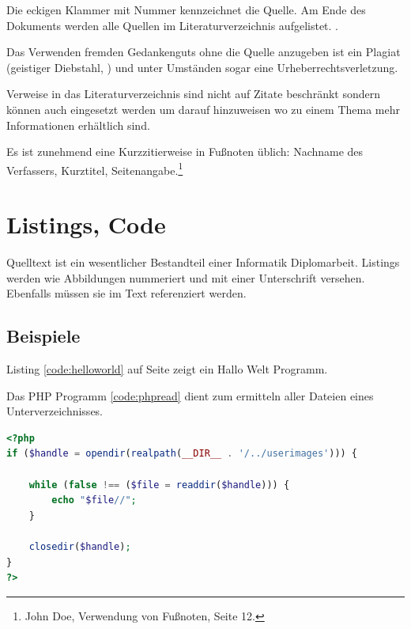 Die eckigen Klammer mit Nummer kennzeichnet die Quelle.
Am Ende des Dokuments werden alle Quellen im Literaturverzeichnis aufgelistet. \cite{bib:wikilitverz}.

Das Verwenden fremden Gedankenguts ohne die Quelle anzugeben ist ein Plagiat (geistiger Diebstahl, \cite{bib:wikiplagiat}) und unter Umständen sogar eine Urheberrechtsverletzung.


Verweise in das Literaturverzeichnis sind nicht auf Zitate beschränkt sondern können auch eingesetzt werden um darauf hinzuweisen wo zu einem Thema mehr Informationen erhältlich sind.


Es ist zunehmend eine Kurzzitierweise in Fußnoten üblich: Nachname des Verfassers, Kurztitel, Seitenangabe.\footnote{John Doe, \glqq Verwendung von Fußnoten\grqq, Seite 12.}


\section{Listings, Code}

Quelltext ist ein wesentlicher Bestandteil einer Informatik Diplomarbeit.
Listings werden wie Abbildungen nummeriert und mit einer Unterschrift versehen.
Ebenfalls müssen sie im Text referenziert werden.

\subsection{Beispiele}

Listing \ref{code:helloworld} auf Seite \pageref{code:helloworld} zeigt ein Hallo Welt Programm.

\begin{minipage}{\linewidth}

\end{minipage}


Das PHP Programm \ref{code:phpread} dient zum ermitteln aller Dateien eines Unterverzeichnisses.

\begin{lstlisting}[language=PHP,caption={Alle Dateinamen ausgeben.},label=code:phpread]
<?php
if ($handle = opendir(realpath(__DIR__ . '/../userimages'))) {
    
    while (false !== ($file = readdir($handle))) {
        echo "$file//";
    }

    closedir($handle);
}
?>
\end{lstlisting}

